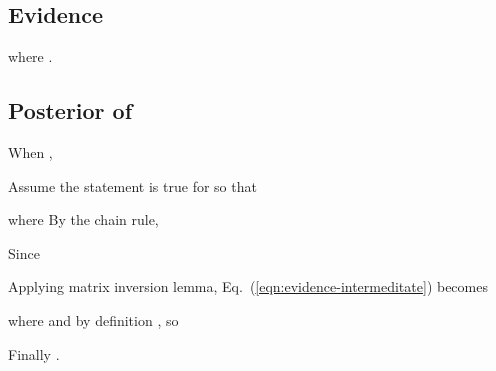 \documentclass[journal]{IEEEtran}
\begin{document}
\subsection{Evidence}\label{apdx:evidence}

where . 

\subsection{Posterior of }\label{apdx:prediction}
When ,

Assume the statement is true for  so that

where  By the chain rule,

Since



Applying matrix inversion lemma, Eq.~(\ref{eqn:evidence-intermeditate}) becomes

where 
and by definition , so 

Finally .










\ifCLASSOPTIONcaptionsoff
  \newpage
\fi
\end{document}

